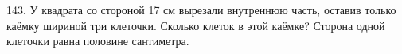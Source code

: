 143. У квадрата со стороной 17 см вырезали внутреннюю часть, оставив только каёмку шириной три клеточки. Сколько клеток в этой каёмке? Сторона одной клеточки равна половине сантиметра.\\
